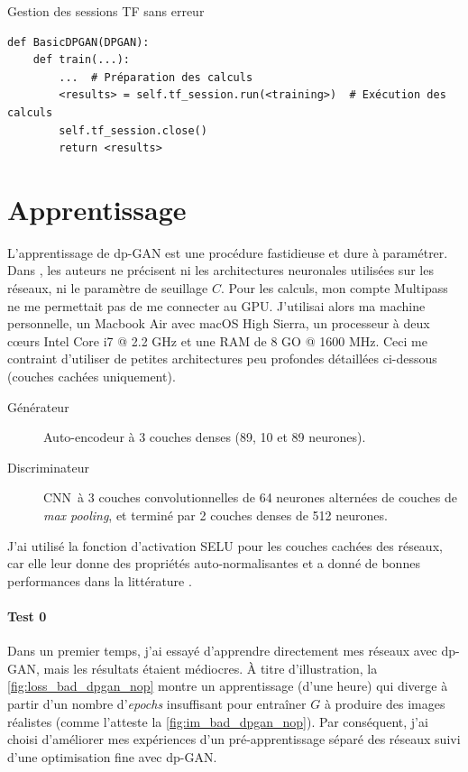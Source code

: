 \documentclass[a4paper,11pt,twoside]{article}
\theoremstyle{definition}
\begin{document}
\begin{listing}
\caption{Gestion des sessions TF sans erreur}
\label{tfsess_after}
\begin{verbatim}
def BasicDPGAN(DPGAN):
    def train(...):
        ...  # Préparation des calculs
        <results> = self.tf_session.run(<training>)  # Exécution des calculs
        self.tf_session.close()
        return <results>
\end{verbatim}
\end{listing}


\section{Apprentissage}
\label{app}

L'apprentissage de dp-GAN est une procédure fastidieuse et dure à paramétrer. Dans \cite{dpgan}, les auteurs ne précisent ni les architectures neuronales utilisées sur les réseaux, ni le paramètre de seuillage $C$. Pour les calculs, mon compte Multipass ne me permettait pas de me connecter au GPU. J'utilisai alors ma machine personnelle, un Macbook Air avec macOS High Sierra, un processeur à deux cœurs Intel Core i7 @ 2.2 GHz et une RAM de 8 GO @ 1600 MHz. Ceci me contraint d'utiliser de petites architectures peu profondes détaillées ci-dessous (couches cachées uniquement).

\begin{description}
    \item[Générateur] Auto-encodeur à 3 couches denses (89, 10 et 89 neurones).
    \item[Discriminateur] CNN à 3 couches convolutionnelles de 64 neurones alternées de couches de \textit{max pooling}, et terminé par 2 couches denses de 512 neurones.
\end{description}

J'ai utilisé la fonction d'activation SELU pour les couches cachées des réseaux, car elle leur donne des propriétés auto-normalisantes et a donné de bonnes performances dans la littérature \cite{selu}.

\paragraph{Test 0}
Dans un premier temps, j'ai essayé d'apprendre directement mes réseaux avec dp-GAN, mais les résultats étaient médiocres. À titre d'illustration, la \autoref{fig:loss_bad_dpgan_nop} montre un apprentissage (d'une heure) qui diverge à partir d'un nombre d'\textit{epochs} insuffisant pour entraîner $G$ à produire des images réalistes (comme l'atteste la \autoref{fig:im_bad_dpgan_nop}). Par conséquent, j'ai choisi d'améliorer mes expériences d'un pré-apprentissage séparé des réseaux suivi d'une optimisation fine avec dp-GAN.
\end{document}
